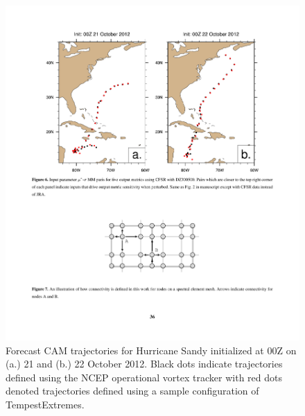 \documentclass[gmdd, hvmath]{copernicus}
\begin{document}

\begin{figure}
\begin{center}
\includegraphics[width=36pc]{plot-sandy-traj.pdf}
\end{center}
\caption{Forecast CAM trajectories for Hurricane Sandy initialized at 00Z on (a.) 21 and (b.) 22 October 2012. Black dots indicate trajectories defined using the NCEP operational vortex tracker with red dots denoted trajectories defined using a sample configuration of TempestExtremes.} \label{fig:SandyTraj}
\end{figure}
\end{document}
